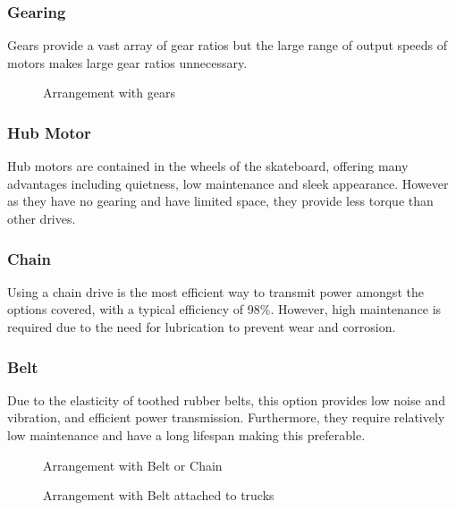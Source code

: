 \documentclass[journal,10pt]{IEEEtran}
\begin{document}
        \subsubsection{Gearing}
            Gears provide a vast array of gear ratios but the large range of output speeds of motors makes large gear ratios unnecessary.
        \begin{figure}[H]
            \centering
            \caption{Arrangement with gears}
            \label{fig:DrivetrainChain}
        \end{figure}
        \subsubsection{Hub Motor}
            Hub motors are contained in the wheels of the skateboard, offering many advantages including quietness, low maintenance and sleek appearance.
            However as they have no gearing and have limited space, they provide less torque than other drives. %
        \subsubsection{Chain}
            Using a chain drive is the most efficient way to transmit power amongst the options covered, with a typical efficiency of 98\%. \cite{Mechanical_Power_Transmission} However, high maintenance is required due to the need for lubrication to prevent wear and corrosion. 
        \subsubsection{Belt}
            Due to the elasticity of toothed rubber belts, this option provides low noise and vibration, and efficient power transmission. Furthermore, they require relatively low maintenance and have a long lifespan making this preferable.
        \begin{figure}[H]
            \centering
            \caption{Arrangement with Belt or Chain}
            \label{fig:Drivetrain2}
        \end{figure}
        \begin{figure}[H]
            \centering
            \caption{Arrangement with Belt attached to trucks}
            \label{fig:Drivetrain3}
        \end{figure}
        
\end{document}
